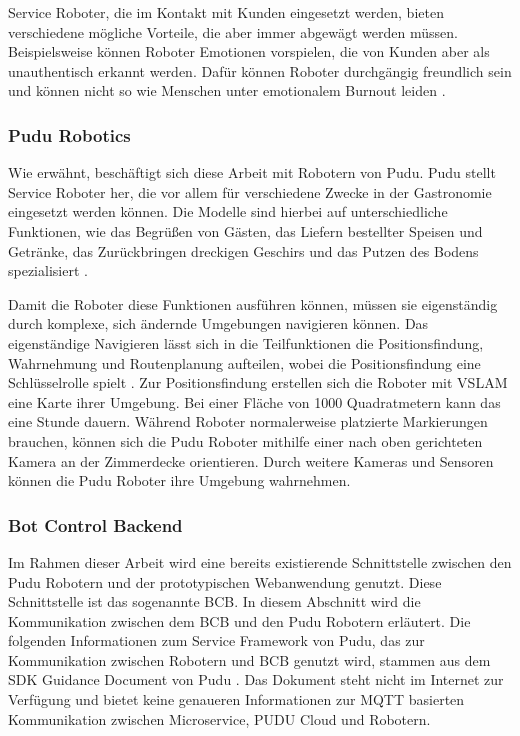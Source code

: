 Service Roboter, die im Kontakt mit Kunden eingesetzt werden, bieten verschiedene mögliche Vorteile, die aber immer abgewägt werden müssen. Beispielsweise können Roboter Emotionen vorspielen, die von Kunden aber als unauthentisch erkannt werden. Dafür können Roboter durchgängig freundlich sein und können nicht so wie Menschen unter emotionalem Burnout leiden \cite[S.~427]{Paluch2020}. 

\subsubsection{Pudu Robotics}
Wie erwähnt, beschäftigt sich diese Arbeit mit Robotern von Pudu. Pudu stellt Service Roboter her, die vor allem für verschiedene Zwecke in der Gastronomie eingesetzt werden können. Die Modelle sind hierbei auf unterschiedliche Funktionen, wie das Begrüßen von Gästen, das Liefern bestellter Speisen und Getränke, das Zurückbringen dreckigen Geschirs und das Putzen des Bodens spezialisiert \cite{PUDU2024}.

Damit die Roboter diese Funktionen ausführen können, müssen sie eigenständig durch komplexe, sich ändernde Umgebungen navigieren können. Das eigenständige Navigieren lässt sich in die Teilfunktionen die Positionsfindung, Wahrnehmung und Routenplanung aufteilen, wobei die Positionsfindung eine Schlüsselrolle spielt \cite{Nature2022}. Zur Positionsfindung erstellen sich die Roboter mit \ac{VSLAM} eine Karte ihrer Umgebung. Bei einer Fläche von 1000 Quadratmetern kann das eine Stunde dauern. Während Roboter normalerweise platzierte Markierungen brauchen, können sich die Pudu Roboter mithilfe einer nach oben gerichteten Kamera an der Zimmerdecke orientieren.\cite{Pudu2023} Durch weitere Kameras und Sensoren können die Pudu Roboter ihre Umgebung wahrnehmen\cite{Nature2022}.

\subsubsection{Bot Control Backend}\label{sec:BotControlBackend}
Im Rahmen dieser Arbeit wird eine bereits existierende Schnittstelle zwischen den Pudu Robotern und der prototypischen Webanwendung genutzt. Diese Schnittstelle ist das sogenannte \ac{BCB}. In diesem Abschnitt wird die Kommunikation zwischen dem \ac{BCB} und den Pudu Robotern erläutert. Die folgenden Informationen zum Service Framework von Pudu, das zur Kommunikation zwischen Robotern und \ac{BCB} genutzt wird, stammen aus dem SDK Guidance Document von Pudu \cite{PuduSDK}. Das Dokument steht nicht im Internet zur Verfügung und bietet keine genaueren Informationen zur MQTT basierten Kommunikation zwischen Microservice, PUDU Cloud und Robotern.

